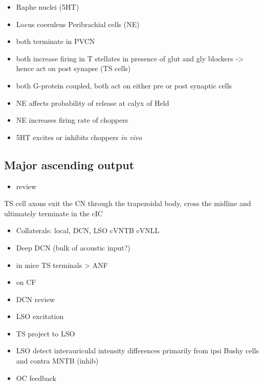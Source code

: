 \begin{itemize}
\item Raphe nuclei (5HT)
\item Locus coeruleus Peribrachial cells (NE)
\item both terminate in PVCN \citep{KlepperHerbert:1991,Thompson:2003,ThompsonLauder:2005,Thompson:2003a,ThompsonWiechmann:2002,BehrensSchofieldEtAl:2002,ThompsonThompson:2001,ThompsonThompson:2001a,ThompsonMooreEtAl:1995,ThompsonThompsonEtAl:1994}
\item both increase firing in T stellates \citep{OertelWrightEtAl:2010} in presence of glut and gly blockers -> hence act on post synapse (TS cells)
\item both G-protein coupled, both act on either pre or post synaptic cells
\item NE affects probability of release at calyx of Held
\item NE increases firing rate of choppers \citep{KosslVater:1989,Ebert:1996}
\item 5HT excites or inhibits choppers \emph{in vivo} \citep{EbertOstwald:1992}
\end{itemize}
\subsection{Major ascending output}
\label{sec-1_6}


\begin{itemize}
\item review \citep{DoucetRyugo:2006}
\end{itemize}

TS cell axons exit the CN through the trapezoidal body, cross the midline and ultimately terminate in the cIC \citep{Adams:1979}


\begin{itemize}
\item Collaterals: local, DCN, LSO cVNTB cVNLL \citep{Warr:1969,SmithJorisEtAl:1993,Thompson:1998,DoucetRyugo:2003}
\item Deep DCN (bulk of acoustic input?)
\item in mice TS terminals > ANF \citep{CaoMcGinleyEtAl:2008}
\item on CF \citep{SmithRhode:1989,FriedlandPongstapornEtAl:2003,DoucetRyugo:1997}
\item DCN review \citep{OertelYoung:2004}
\item LSO excitation
\item TS project to LSO \citep{Thompson:1998,DoucetRyugo:2003,ThompsonThompson:1991a}
\item LSO detect interauriculal intensity differences primarily from ipsi Bushy cells and contra MNTB (inhib)
\item OC feedback
\end{itemize}

